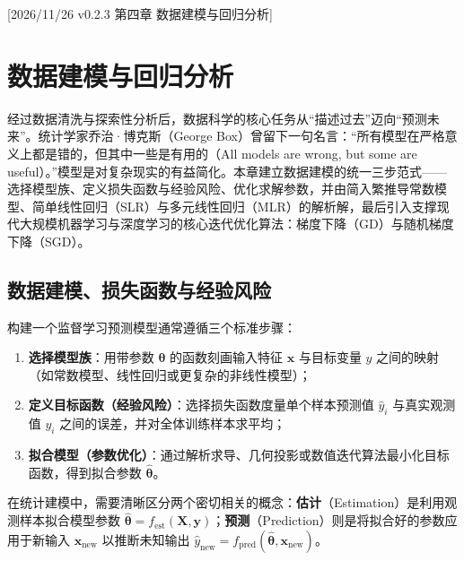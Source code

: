 %
%
[2026/11/26 v0.2.3 第四章 数据建模与回归分析]
\chapter{数据建模与回归分析}\label{ch:regression}

经过数据清洗与探索性分析后，数据科学的核心任务从“描述过去”迈向“预测未来”。统计学家乔治·博克斯（George Box）曾留下一句名言：“所有模型在严格意义上都是错的，但其中一些是有用的（All models are wrong, but some are useful）。”模型是对复杂现实的有益简化。本章建立数据建模的统一三步范式——选择模型族、定义损失函数与经验风险、优化求解参数，并由简入繁推导常数模型、简单线性回归（SLR）与多元线性回归（MLR）的解析解，最后引入支撑现代大规模机器学习与深度学习的核心迭代优化算法：梯度下降（GD）与随机梯度下降（SGD）。

\section{数据建模、损失函数与经验风险}\label{sec:modeling-erm}

构建一个监督学习预测模型通常遵循三个标准步骤：
\begin{enumerate}
  \item \textbf{选择模型族}：用带参数 $\bm{\theta}$ 的函数刻画输入特征 $\bm{x}$ 与目标变量 $y$ 之间的映射（如常数模型、线性回归或更复杂的非线性模型）；
  \item \textbf{定义目标函数（经验风险）}：选择损失函数度量单个样本预测值 $\hat{y}_i$ 与真实观测值 $y_i$ 之间的误差，并对全体训练样本求平均；
  \item \textbf{拟合模型（参数优化）}：通过解析求导、几何投影或数值迭代算法最小化目标函数，得到拟合参数 $\hat{\bm{\theta}}$。
\end{enumerate}

在统计建模中，需要清晰区分两个密切相关的概念：\textbf{估计}（Estimation）是利用观测样本拟合模型参数 $\hat{\bm{\theta}} = f_{\text{est}}(\bm{X}, \bm{y})$；\textbf{预测}（Prediction）则是将拟合好的参数应用于新输入 $\bm{x}_{\text{new}}$ 以推断未知输出 $\hat{y}_{\text{new}} = f_{\text{pred}}(\hat{\bm{\theta}}, \bm{x}_{\text{new}})$。

